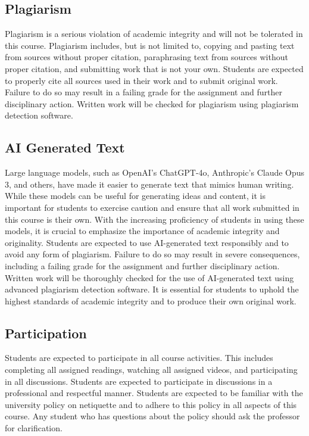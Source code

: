 \documentclass[12pt, letterpaper]{article}
\begin{document}
\subsection*{Plagiarism}
Plagiarism is a serious violation of academic integrity and will not be tolerated in this course. Plagiarism includes, but is not limited to, copying and pasting text from sources without proper citation, paraphrasing text from sources without proper citation, and submitting work that is not your own. Students are expected to properly cite all sources used in their work and to submit original work. Failure to do so may result in a failing grade for the assignment and further disciplinary action. Written work will be checked for plagiarism using plagiarism detection software.

\subsection*{AI Generated Text} 
Large language models, such as OpenAI's ChatGPT-4o, Anthropic's Claude Opus 3, and others, have made it easier to generate text that mimics human writing. While these models can be useful for generating ideas and content, it is important for students to exercise caution and ensure that all work submitted in this course is their own. With the increasing proficiency of students in using these models, it is crucial to emphasize the importance of academic integrity and originality. Students are expected to use AI-generated text responsibly and to avoid any form of plagiarism. Failure to do so may result in severe consequences, including a failing grade for the assignment and further disciplinary action. Written work will be thoroughly checked for the use of AI-generated text using advanced plagiarism detection software. It is essential for students to uphold the highest standards of academic integrity and to produce their own original work.

\subsection*{Participation}

Students are expected to participate in all course activities. This includes completing all assigned readings, watching all assigned videos, and participating in all discussions. Students are expected to participate in discussions in a professional and respectful manner. Students are expected to be familiar with the university policy on netiquette and to adhere to this policy in all aspects of this course. Any student who has questions about the policy should ask the professor for clarification. 
\end{document}
